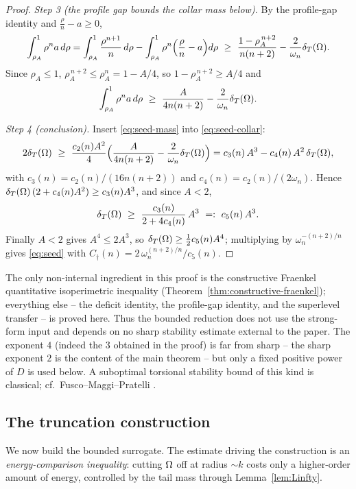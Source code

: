 \begin{proof}
\emph{Step 3 (the profile gap bounds the collar mass below).}
By the profile-gap identity and $\tfrac\rho n-a\ge0$,
\[
   \int_{\rho_A}^1\rho^n a\,d\rho
   =\int_{\rho_A}^1\frac{\rho^{n+1}}{n}\,d\rho
     -\int_{\rho_A}^1\rho^n\Bigl(\frac\rho n-a\Bigr)d\rho
   \ \ge\ \frac{1-\rho_A^{\,n+2}}{n(n+2)}-\frac2{\omega_n}\dT(\Om).
\]
Since $\rho_A\le1$, $\rho_A^{\,n+2}\le\rho_A^n=1-A/4$, so
$1-\rho_A^{\,n+2}\ge A/4$ and
\begin{equation}\label{eq:seed-mass}
   \int_{\rho_A}^1\rho^n a\,d\rho\ \ge\ \frac{A}{4n(n+2)}-\frac2{\omega_n}\dT(\Om).
\end{equation}

\emph{Step 4 (conclusion).} Insert \eqref{eq:seed-mass} into
\eqref{eq:seed-collar}:
\[
   2\delta_T(\Omega)\ \ge\ \frac{c_2(n)A^2}{4}
   \Bigl(\frac{A}{4n(n+2)}-\frac2{\omega_n}\delta_T(\Omega)\Bigr)
   = c_3(n)\,A^3-c_4(n)\,A^2\,\delta_T(\Omega),
\]
with $c_3(n)=c_2(n)/(16n(n+2))$ and $c_4(n)=c_2(n)/(2\omega_n)$. Hence
$\delta_T(\Omega)\,(2+c_4(n)A^2)\ge c_3(n)A^3$, and since $A<2$,
\[
   \dT(\Om)\ \ge\ \frac{c_3(n)}{2+4c_4(n)}\,A^3\ =:\ c_5(n)\,A^3 .
\]
Finally $A<2$ gives $A^4\le2A^3$, so $\delta_T(\Omega)\ge\tfrac12 c_5(n)A^4$;
multiplying by $\omega_n^{-(n+2)/n}$ gives \eqref{eq:seed} with
$C_\dagger(n)=2\,\omega_n^{(n+2)/n}/c_5(n)$.
\end{proof}

\begin{remark}\label{rem:seed-status}
The only non-internal ingredient in this proof is the constructive Fraenkel
quantitative isoperimetric inequality (Theorem~\ref{thm:constructive-fraenkel});
everything else -- the deficit identity, the profile-gap identity, and the
superlevel transfer -- is proved here. Thus the bounded reduction does not use
the strong-form input and depends on no sharp stability estimate external to the
paper. The exponent $4$ (indeed the $3$ obtained in the proof) is far
from sharp -- the sharp exponent $2$ is the content of the main theorem --
but only a fixed positive power of $D$ is used below. A suboptimal torsional
stability bound of this kind is classical; cf.\ Fusco--Maggi--Pratelli
\cite{FMP}.
\end{remark}

\subsection{The truncation construction}\label{ssec:truncation}

We now build the bounded surrogate. The estimate driving the construction
is an \emph{energy-comparison inequality}: cutting $\Omega$ off at radius
$\sim k$ costs only a higher-order amount of energy, controlled by the
tail mass through Lemma~\ref{lem:Linfty}.

